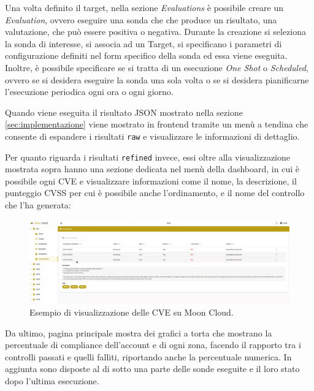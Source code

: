 Una volta definito il target, nella sezione \textit{Evaluations} è possibile creare un \textit{Evaluation}, ovvero eseguire una sonda che che produce un risultato, una valutazione, che può essere positiva o negativa. Durante la creazione si seleziona la sonda di interesse, si associa ad un Target, si specificano i parametri di configurazione definiti nel form specifico della sonda ed essa viene eseguita. Inoltre, è possibile specificare se si tratta di un esecuzione \textit{One Shot} o \textit{Scheduled}, ovvero se si desidera eseguire la sonda una sola volta o se si desidera pianificarne l'esecuzione periodica ogni ora o ogni giorno.

Quando viene eseguita il risultato JSON mostrato nella sezione \ref{sec:implementazione} viene mostrato in frontend tramite un menù a tendina che consente di espandere i risultati \texttt{raw} e visualizzare le informazioni di dettaglio.

Per quanto riguarda i risultati \texttt{refined} invece, essi oltre alla visualizzazione mostrata sopra hanno una sezione dedicata nel menù della dashboard, in cui è possibile ogni CVE e visualizzare informazioni come il nome, la descrizione, il punteggio CVSS per cui è possibile anche l'ordinamento, e il nome del controllo che l'ha generata: 

\begin{center}
\begin{figure}
\centering
\includegraphics[width=\textwidth]{immagini/cve.png}
\caption{Esempio di visualizzazione delle CVE su Moon Cloud.}
\label{fig:Moon Cloudcve}
\end{figure}
\end{center}

Da ultimo, pagina principale mostra dei grafici a torta che mostrano la percentuale di compliance dell'account e di ogni zona, facendo il rapporto tra i controlli passati e quelli falliti, riportando anche la percentuale numerica. In aggiunta sono disposte al di sotto una parte delle sonde eseguite e il loro stato dopo l'ultima esecuzione.

